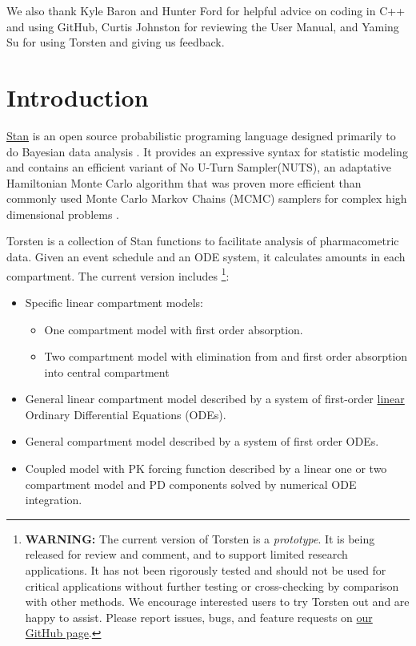\documentclass[12pt, reqno, oneside]{amsbook}
\numberwithin{equation}{chapter}
\numberwithin{figure}{chapter}
\numberwithin{table}{chapter}
\theoremstyle{remark}
\begin{document}
We also thank Kyle Baron and Hunter Ford for helpful advice on coding
in C++ and using GitHub, Curtis Johnston for reviewing the User
Manual, and Yaming Su for using Torsten and giving us feedback.
\chapter{Introduction}
\label{sec:orgc21e46a}
\href{https://mc-stan.org/}{Stan} is an open source probabilistic programing language designed
primarily to do Bayesian data analysis
\cite{carpenter17_stan}. It provides an expressive syntax for statistic
modeling and contains an efficient variant of No U-Turn
Sampler(NUTS), an adaptative Hamiltonian Monte Carlo
algorithm that was proven more efficient than commonly used Monte Carlo Markov Chains
(MCMC) samplers for complex high dimensional problems \cite{hoffman_no-u-turn_2011,betancourt_hmc_2018}.

Torsten is a collection of Stan functions to facilitate analysis of
pharmacometric data. Given an event schedule and an ODE system, it calculates amounts
in each compartment. The current version includes \footnote{\textbf{WARNING:} The current version of Torsten is a \emph{prototype}. It is being released for review and comment, and to support limited research applications. It has not been rigorously tested and should not be used for critical applications without further testing or cross-checking by comparison with other methods. We encourage interested users to try Torsten out and are happy to assist. Please report issues, bugs, and feature requests on \href{https://github.com/metrumresearchgroup/stan}{our GitHub page}.}:
\begin{itemize}
\item Specific linear compartment models:
\begin{itemize}
\item One compartment model with first order absorption.
\item Two compartment model with elimination from and first order absorption into central compartment
\end{itemize}
\item General linear compartment model described by a system of first-order \uline{linear} Ordinary Differential Equations (ODEs).
\item General compartment model described by a system of first order ODEs.
\item Coupled model with PK forcing function described by a linear one or two compartment model and PD components solved by numerical ODE integration.
\end{itemize}
\end{document}

